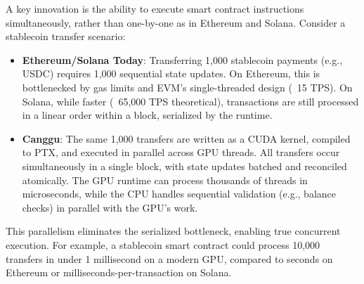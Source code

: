 \documentclass[12pt]{article}
\begin{document}
\begin{justify}
    
A key innovation is the ability to execute smart contract instructions simultaneously, rather than one-by-one as in Ethereum and Solana. Consider a stablecoin transfer scenario:
\begin{itemize}
    \item \textbf{Ethereum/Solana Today}: Transferring 1,000 stablecoin payments (e.g., USDC) requires 1,000 sequential state updates. On Ethereum, this is bottlenecked by gas limits and EVM’s single-threaded design (~15 TPS). On Solana, while faster (~65,000 TPS theoretical), transactions are still processed in a linear order within a block, serialized by the runtime.
    
    \item \textbf{Canggu}: The same 1,000 transfers are written as a CUDA kernel, compiled to PTX, and executed in parallel across GPU threads. All transfers occur simultaneously in a single block, with state updates batched and reconciled atomically. The GPU runtime can process thousands of threads in microseconds, while the CPU handles sequential validation (e.g., balance checks) in parallel with the GPU’s work.
\end{itemize}

This parallelism eliminates the serialized bottleneck, enabling true concurrent execution. For example, a stablecoin smart contract could process 10,000 transfers in under 1 millisecond on a modern GPU, compared to seconds on Ethereum or milliseconds-per-transaction on Solana.

\end{justify}
\end{document}
